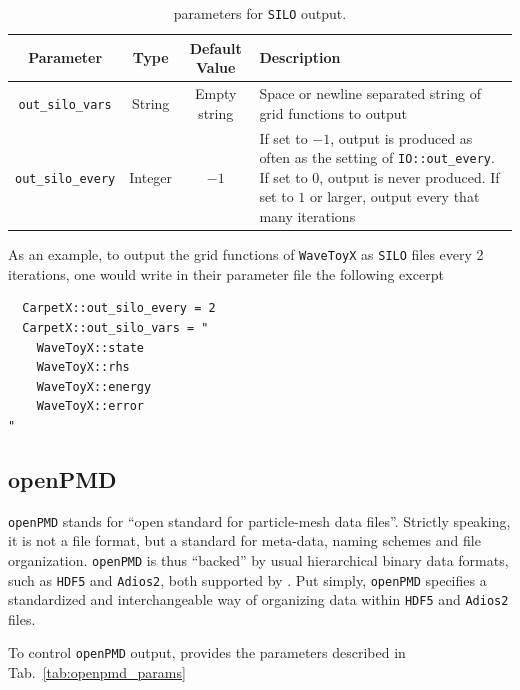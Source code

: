 \begin{table}[ht]
  \centering
  \begin{tabular*}{\textwidth}{cccp{24em}}
    Parameter                 & Type    & Default Value  & Description \\\hline\hline
    \texttt{out\_silo\_vars}  & String  & Empty string   & Space or newline separated string of grid functions to output \\
    \texttt{out\_silo\_every} & Integer & $-1$           & If set to $-1$, output is produced as often as the setting of \texttt{IO::out\_every}. If set to $0$, output is never produced. If set to $1$ or larger, output every that many iterations \\\hline\hline
  \end{tabular*}
  \label{tab:silo_params}
  \caption{\CarpetX\space parameters for \texttt{SILO} output.}
\end{table}

As an example, to output the grid functions of \texttt{WaveToyX} as \texttt{SILO} files every 2 iterations, one would write in their parameter file the following excerpt

\begin{verbatim}
  CarpetX::out_silo_every = 2
  CarpetX::out_silo_vars = "
    WaveToyX::state
    WaveToyX::rhs
    WaveToyX::energy
    WaveToyX::error
"
\end{verbatim}

\subsection{openPMD}
\label{sec:openpmd}

\texttt{openPMD} stands for ``open standard for particle-mesh data files''. Strictly speaking, it is not a file format, but a standard for meta-data, naming schemes and file organization. \texttt{openPMD} is thus ``backed'' by usual hierarchical binary data formats, such as \texttt{HDF5} and \texttt{Adios2}, both supported by \CarpetX. Put simply, \texttt{openPMD} specifies a standardized and interchangeable way of organizing data within \texttt{HDF5} and \texttt{Adios2} files.

To control \texttt{openPMD} output, \CarpetX\space provides the parameters described in Tab.~\ref{tab:openpmd_params}

